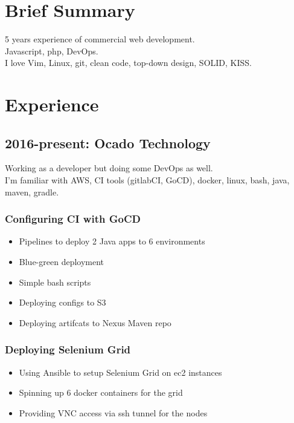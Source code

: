 \documentclass[a4paper, 14pt]{article}
\begin{document}
\begin{center}
	\textsc{\Huge{}}
\end{center}


\section{Brief Summary}
  5 years experience of commercial web development. \\
  Javascript, php, DevOps. \\
  I love Vim, Linux, git, clean code, top-down design, SOLID, KISS.

\section{Experience}
  \subsection{2016-present: Ocado Technology}

		Working as a developer but doing some DevOps as well. \\
		I'm familiar with AWS, CI tools (gitlabCI, GoCD), docker, linux, bash, java, maven, gradle.

		\subsubsection{Configuring CI with GoCD}
			\begin{itemize}
				\item Pipelines to deploy 2 Java apps to 6 environments \\
				\item Blue-green deployment \\
				\item Simple bash scripts \\
				\item Deploying configs to S3 \\
				\item Deploying artifcats to Nexus Maven repo 
			\end{itemize}

		\subsubsection{Deploying Selenium Grid}
			\begin{itemize}
				\item Using Ansible to setup Selenium Grid on ec2 instances \\
				\item Spinning up 6 docker containers for the grid \\
				\item Providing VNC access via ssh tunnel for the nodes
			\end{itemize}
\end{document}
